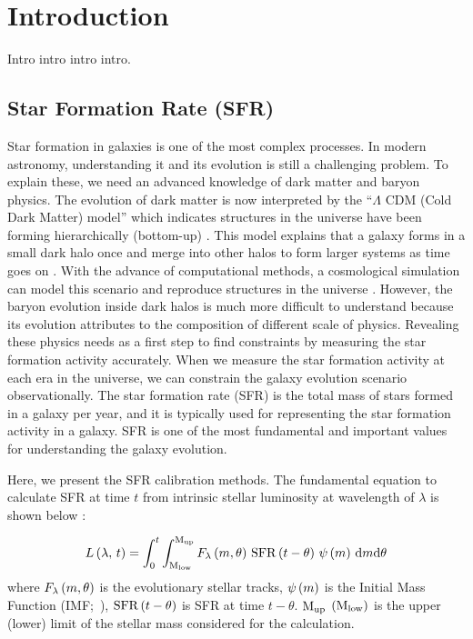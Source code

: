 \chapter{Introduction}\label{chap:introduction}
\begin{chapabstract}

Intro intro intro intro.

\end{chapabstract}

\section{Star Formation Rate (SFR)}

Star formation in galaxies is one of the most complex processes.
In modern astronomy, understanding it and its evolution is still a challenging problem.
To explain these, we need an advanced knowledge of dark matter and baryon physics.
The evolution of dark matter is now interpreted by the ``$\Lambda$ CDM (Cold Dark Matter) model'' which indicates structures in the universe have been forming hierarchically (bottom-up) \citep{Peebles1982}.
This model explains that a galaxy forms in a small dark halo once and merge into other halos to form larger systems as time goes on \citep{Blumenthal1984}.
With the advance of computational methods, a cosmological simulation can model this scenario and reproduce structures in the universe \citep[e.g.,][]{Navarro2000, Vale2004}.
However, the baryon evolution inside dark halos is much more difficult to understand because its evolution attributes to the composition of different scale of physics.
Revealing these physics needs as a first step to find constraints by measuring the star formation activity accurately.
When we measure the star formation activity at each era in the universe, we can constrain the galaxy evolution scenario observationally.
The star formation rate (SFR) is the total mass of stars formed in a galaxy per year, and it is typically used for representing the star formation activity in a galaxy.
SFR is one of the most fundamental and important values for understanding the galaxy evolution.

Here, we present the SFR calibration methods.
The fundamental equation to calculate SFR at time $t$ from intrinsic stellar luminosity at wavelength of $\lambda$ is shown below \citep{Buat1991}:

\begin{equation}\label{eq:Buat1991eq1}
    L\left(\lambda,\,t\right)=\int_{0}^{t} \int_{\mathrm{M}_{\mathrm{low}}}^{\mathrm{M}_{\mathrm{up}}} F_{\lambda}\left(m, \theta\right)\,\mathrm{SFR}\left(t-\theta\right)\,\psi\left(m\right)\,\mathrm{d}m \mathrm{d} \theta
\end{equation}
where $F_{\lambda}\left(m, \theta\right)$ is the evolutionary stellar tracks, $\psi\left(m\right)$ is the Initial Mass Function (IMF;~\citealt{Salpeter1955, Kroupa2001, Chabrier2003}), $\mathrm{SFR}\left(t-\theta\right)$ is SFR at time $t-\theta$.
$\mathrm{M}_{\mathrm{up}}$ $\left(\mathrm{M}_{\mathrm{low}}\right)$ is the upper (lower) limit of the stellar mass considered for the calculation.

